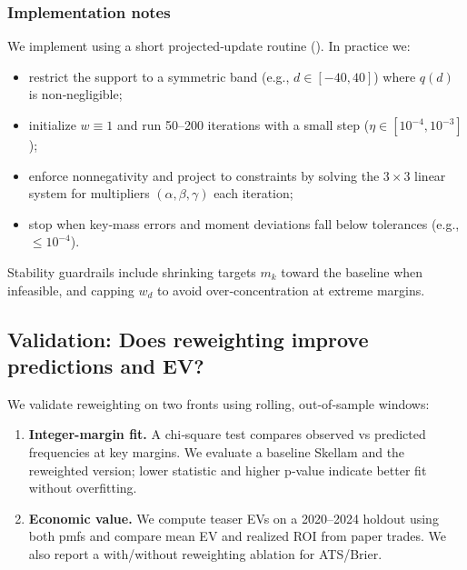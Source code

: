\subsubsection*{Implementation notes}
We implement  using a short projected‑update routine (). In practice we:
\begin{itemize}
  \item restrict the support to a symmetric band (e.g., $d\in[-40,40]$) where $q(d)$ is non‑negligible;
  \item initialize $w\equiv 1$ and run 50–200 iterations with a small step (\(\eta\in[10^{-4},10^{-3}]\));
  \item enforce nonnegativity and project to constraints by solving the $3\times 3$ linear system for multipliers $(\alpha,\beta,\gamma)$ each iteration;
  \item stop when key‑mass errors and moment deviations fall below tolerances (e.g., $\le 10^{-4}$).
\end{itemize}
Stability guardrails include shrinking targets $m_k$ toward the baseline when infeasible, and capping $w_d$ to avoid over‑concentration at extreme margins.

\subsection{Validation: Does reweighting improve predictions and EV?}\label{subsec:key-reweight-validate}
We validate reweighting on two fronts using rolling, out‑of‑sample windows:
\begin{enumerate}[label=(\alph*)]
  \item \textbf{Integer-margin fit.} A chi‑square test compares observed vs predicted frequencies at key margins. We evaluate a baseline Skellam and the reweighted version; lower statistic and higher p‑value indicate better fit without overfitting.
  \item \textbf{Economic value.} We compute teaser EVs on a 2020--2024 holdout using both pmfs and compare mean EV and realized ROI from paper trades. We also report a with/without reweighting ablation for ATS/Brier.
\end{enumerate}

